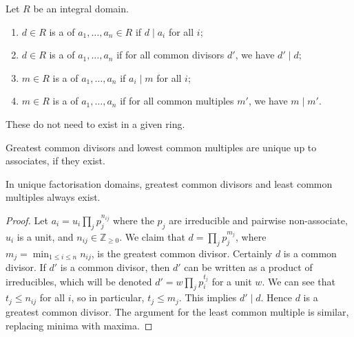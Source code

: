 \begin{definition}
	Let $R$ be an integral domain.
	\begin{enumerate}
		\item $d \in R$ is a  of $a_1, \dots, a_n \in R$ if $d \mid a_i$ for all $i$;
		\item $d \in R$ is a  of $a_1, \dots, a_n$ if for all common divisors $d'$, we have $d' \mid d$;
		\item $m \in R$ is a  of $a_1, \dots, a_n$ if $a_i \mid m$ for all $i$;
		\item $m \in R$ is a  of $a_1, \dots, a_n$ if for all common multiples $m'$, we have $m \mid m'$.
	\end{enumerate}
\end{definition}

\begin{warning}
	These do not need to exist in a given ring.
\end{warning} 

\begin{remark}
	Greatest common divisors and lowest common multiples are unique up to associates, if they exist.
\end{remark}

\begin{proposition} \label{prp:10.9}
	In unique factorisation domains, greatest common divisors and least common multiples always exist.
\end{proposition}

\begin{proof}
	Let $a_i = u_i \prod_j p_j^{n_{ij}}$ where the $p_j$ are irreducible and pairwise non-associate, $u_i$ is a unit, and $n_{ij} \in \mathbb Z_{\geq 0}$.
	We claim that $d = \prod_j p_j^{m_j}$, where $m_j = \min_{1 \leq i \leq n} n_{ij}$, is the greatest common divisor.
	Certainly $d$ is a common divisor.
	If $d'$ is a common divisor, then $d'$ can be written as a product of irreducibles, which will be denoted $d' = w \prod_j p_i^{t_j}$ for a unit $w$.
	We can see that $t_j \leq n_{ij}$ for all $i$, so in particular, $t_j \leq m_j$.
	This implies $d' \mid d$.
	Hence $d$ is a greatest common divisor.
	The argument for the least common multiple is similar, replacing minima with maxima.
\end{proof}

